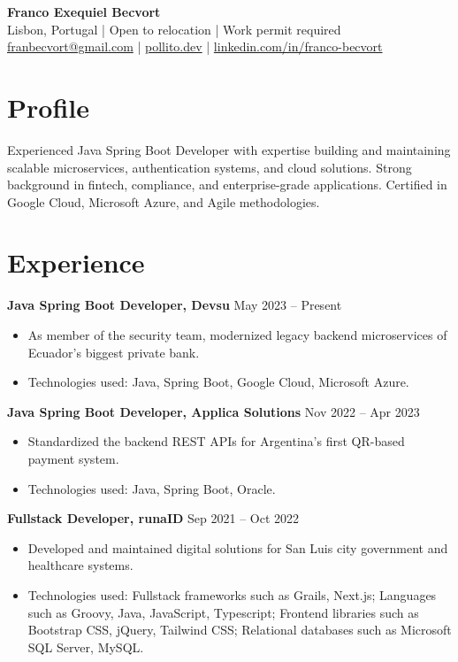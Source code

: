 \documentclass[10pt, letterpaper]{article}
\begin{document}
\begin{center}
    {\LARGE\bfseries Franco Exequiel Becvort} \\
    Lisbon, Portugal | Open to relocation | Work permit required \\
    \href{mailto:franbecvort@gmail.com}{franbecvort@gmail.com} | 
    \href{https://pollito.dev/}{pollito.dev} | 
    \href{https://linkedin.com/in/franco-becvort}{linkedin.com/in/franco-becvort} \\
\end{center}

\vspace{5pt}

\section{Profile}
Experienced Java Spring Boot Developer with expertise building and maintaining scalable microservices, authentication systems, and cloud solutions. Strong background in fintech, compliance, and enterprise-grade applications. Certified in Google Cloud, Microsoft Azure, and Agile methodologies.

\section{Experience}
\textbf{Java Spring Boot Developer, Devsu} \hfill May 2023 – Present \
\begin{itemize}[leftmargin=10pt, noitemsep]
    \item As member of the security team, modernized legacy backend microservices of Ecuador's biggest private bank.
    \item Technologies used: Java, Spring Boot, Google Cloud, Microsoft Azure.
\end{itemize}

\textbf{Java Spring Boot Developer, Applica Solutions} \hfill Nov 2022 – Apr 2023 \
\begin{itemize}[leftmargin=10pt, noitemsep]
    \item Standardized the backend REST APIs for Argentina’s first QR-based payment system.
    \item Technologies used: Java, Spring Boot, Oracle.
\end{itemize}

\textbf{Fullstack Developer, runaID} \hfill Sep 2021 – Oct 2022 \
\begin{itemize}[leftmargin=10pt, noitemsep]
    \item Developed and maintained digital solutions for San Luis city government and healthcare systems.
    \item Technologies used: Fullstack frameworks such as Grails, Next.js; Languages such as Groovy, Java, JavaScript, Typescript; Frontend libraries such as Bootstrap CSS, jQuery, Tailwind CSS; Relational databases such as Microsoft SQL Server, MySQL.
\end{itemize}
\end{document}
